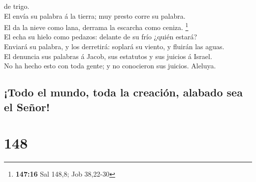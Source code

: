 de trigo.\\
 El envía su palabra á la tierra; muy presto corre su
palabra.\\
 El da la nieve como lana, derrama la escarcha como
ceniza. \footnote{\textbf{147:16} Sal 148,8; Job 38,22-30}\\
 El echa su hielo como pedazos: delante de su frío ¿quién
estará?\\
 Enviará su palabra, y los derretirá: soplará su viento,
y fluirán las aguas.\\
 El denuncia sus palabras á Jacob, sus estatutos y sus
juicios á Israel.\\
 No ha hecho esto con toda gente; y no conocieron sus
juicios. Aleluya.

\hypertarget{todo-el-mundo-toda-la-creaciuxf3n-alabado-sea-el-seuxf1or}{%
\subsection{¡Todo el mundo, toda la creación, alabado sea el
Señor!}\label{todo-el-mundo-toda-la-creaciuxf3n-alabado-sea-el-seuxf1or}}

\hypertarget{section-147}{%
\section{148}\label{section-147}}

